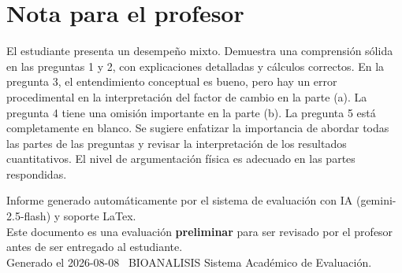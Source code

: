 \documentclass[11pt,a4paper]{article}
\begin{document}
\section*{Nota para el profesor}
\begin{tcolorbox}[
  enhanced, breakable,
  colback=yellow!8, colframe=yellow!60!black,
  fonttitle=\bfseries, coltitle=black,
  title={Observaciones para revisión manual},
  top=4pt, bottom=4pt, left=8pt, right=8pt,
]
El estudiante presenta un desempeño mixto. Demuestra una comprensión sólida en las preguntas 1 y 2, con explicaciones detalladas y cálculos correctos. En la pregunta 3, el entendimiento conceptual es bueno, pero hay un error procedimental en la interpretación del factor de cambio en la parte (a). La pregunta 4 tiene una omisión importante en la parte (b). La pregunta 5 está completamente en blanco. Se sugiere enfatizar la importancia de abordar todas las partes de las preguntas y revisar la interpretación de los resultados cuantitativos. El nivel de argumentación física es adecuado en las partes respondidas.
\end{tcolorbox}

\vspace{12pt}
\begin{center}
  \footnotesize\color{gray}
  Informe generado automáticamente por el sistema de evaluación con IA (gemini-2.5-flash) y soporte LaTex. \\
  Este documento es una evaluación \textbf{preliminar} para ser revisado por el profesor antes de ser entregado al 
  estudiante. \\
  Generado el 2026-08-08 \textbullet\ BIOANALISIS Sistema Académico de Evaluación.
  \end{center}
\end{document}
